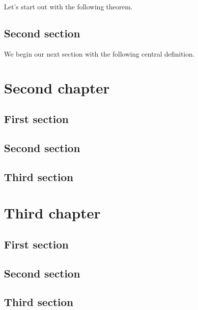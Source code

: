 \documentclass{tstextbook}
\begin{document}
Let's start out with the following theorem.



\section{Second section}

We begin our next section with the following central definition.


\chapter{Second chapter}

\begin{summary}
  \blindtext
\end{summary}

\section{First section}
\Blindtext

\section{Second section}
\Blindtext

\section{Third section}
\Blindtext

\chapter{Third chapter}

\begin{summary}
  \blindtext
\end{summary}

\section{First section}
\Blindtext

\section{Second section}
\Blindtext

\section{Third section}
\Blindtext


\printbibliography{}


\printindex
\end{document}
